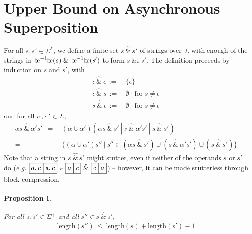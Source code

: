 \documentclass[a4paper,11pt]{article}
\newcommand{\bc}{{\rm b\!c}}
\newcommand{\vph}[1]{\vphantom{#1}}
\newcommand{\ebox}[1]{\fbox{$\vph{',}#1$}}
\begin{document}
\section{Upper Bound on Asynchronous Superposition}\label{upper}
For all $s,s'\in \Sigma^{\ast}$, we define a finite set
$s~\hat{\&}~s'$ of strings over $\Sigma$ with enough of 
the strings in $\bc^{-1}\bc(s)~\&~\bc^{-1}\bc(s')$
to form $s~\&_*~s'$.
The definition proceeds by induction on $s$ and $s'$, with
\begin{align*}
\epsilon\ \hat{\&}\ \epsilon \ :=& \ \{\epsilon\}\\
\epsilon\ \hat{\&}\ s \ :=& \ \emptyset\ \ \mbox{ for } s\neq\epsilon\\
s\ \hat{\&}\ \epsilon \ :=& \ \emptyset\ \ \mbox{ for } s\neq\epsilon
\end{align*}
and for all $\alpha,\alpha'\in \Sigma$,
\begin{align*}
\alpha s~\hat{\&}~\alpha's' \ :=& \ 
(\alpha\cup \alpha')(\alpha s\ \hat{\&}\ s'
\ | \ s~\hat{\&}~\alpha's' \ | \  s~\hat{\&}~s')\\
=&~\{(\alpha\cup\alpha')s''\ | \ s''\in (\alpha s~\hat{\&}~s') \cup 
(s~\hat{\&}~\alpha's') \cup (s~\hat{\&}~s')\}
\end{align*}
Note that a string in $s\ \hat{\&}\ s'$ might stutter, even if neither of the 
operands $s$ or $s'$ do
(\textit{e.g.} $\ebox{a,c}\ebox{a,c}\in
\ebox{a}\ebox{c}\ \hat{\&}\ 
\ebox{c}\ebox{a}$)
-- however, it can be made stutterless through block compression.
\paragraph{Proposition 1.} {\sl For all  $s, s' \in \Sigma^+$
	and all $s''\in s\ \hat{\&}\ s'$,}
\begin{align*}
\mbox{length}(s'')\ \leq\ \mbox{length}(s) + \mbox{length}(s') -1
\end{align*}
\end{document}
